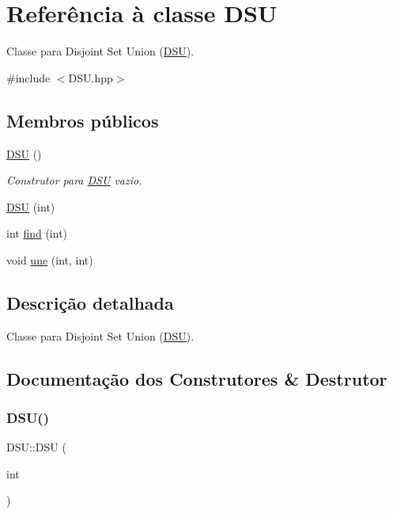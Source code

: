 \hypertarget{classDSU}{}\section{Referência à classe D\+SU}
\label{classDSU}


Classe para Disjoint Set Union (\hyperlink{classDSU}{D\+SU}).  




{\ttfamily \#include $<$D\+S\+U.\+hpp$>$}

\subsection*{Membros públicos}
\begin{DoxyCompactItemize}
\item 
\mbox{\label{classDSU_a537ec9947d526dd1ac2acc3bfe1bf8b3}} 
\hyperlink{classDSU_a537ec9947d526dd1ac2acc3bfe1bf8b3}{D\+SU} ()
\begin{DoxyCompactList}\small\item\em Construtor para \hyperlink{classDSU}{D\+SU} vazio. \end{DoxyCompactList}\item 
\hyperlink{classDSU_ab4ea0f237eac81455e80443b3c060b40}{D\+SU} (int)
\item 
int \hyperlink{classDSU_a3915dd627bd9cd0abc6f83e154944961}{find} (int)
\item 
void \hyperlink{classDSU_a69728d8ed8c2262f76320ca7238e2f1f}{une} (int, int)
\end{DoxyCompactItemize}


\subsection{Descrição detalhada}
Classe para Disjoint Set Union (\hyperlink{classDSU}{D\+SU}). 

\subsection{Documentação dos Construtores \& Destrutor}
\mbox{\label{classDSU_ab4ea0f237eac81455e80443b3c060b40}} 
\subsubsection{\texorpdfstring{D\+S\+U()}{DSU()}}
{\footnotesize\ttfamily D\+S\+U\+::\+D\+SU (\begin{DoxyParamCaption}\item[{int}]{ }\end{DoxyParamCaption})}

